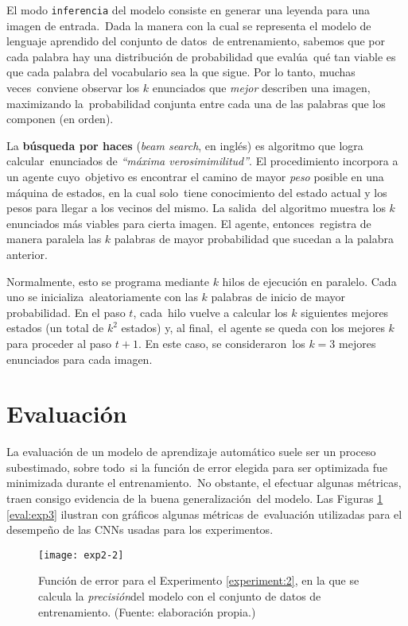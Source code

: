 \noindent
El modo \verb+inferencia+ del modelo consiste en generar una leyenda para una imagen de entrada.\
Dada la manera con la cual se representa el modelo de lenguaje aprendido del conjunto de datos\
de entrenamiento, sabemos que por cada palabra hay una distribución de probabilidad que evalúa\
qué tan viable es que cada palabra del vocabulario sea la que sigue. Por lo tanto, muchas veces\
conviene observar los $k$ enunciados que \emph{mejor} describen una imagen, maximizando la\
probabilidad conjunta entre cada una de las palabras que los componen (en orden).\par
La \textbf{búsqueda por haces} (\emph{beam search}, en inglés) es algoritmo que logra calcular\
enunciados de \emph{``máxima verosimimilitud''}. El procedimiento incorpora a un agente cuyo\
objetivo es encontrar el camino de mayor \emph{peso} posible en una máquina de estados, en la cual solo\
tiene conocimiento del estado actual y los pesos para llegar a los vecinos del mismo. La salida\
del algoritmo muestra los $k$ enunciados más viables para cierta imagen. El agente, entonces\
registra de manera paralela las $k$ palabras de mayor probabilidad que sucedan a la palabra anterior.\par
Normalmente, esto se programa mediante $k$ hilos de ejecución en paralelo. Cada uno se inicializa\
aleatoriamente con las $k$ palabras de inicio de mayor probabilidad. En el paso $t$, cada\
hilo vuelve a calcular los $k$ siguientes mejores estados (un total de $k^2$ estados) y, al final,\
el agente se queda con los mejores $k$ para proceder al paso $t+1$. En este caso, se consideraron\
los $k=3$ mejores enunciados para cada imagen.

\section{Evaluación} \label{sec:metrics}

\noindent
La evaluación de un modelo de aprendizaje automático suele ser un proceso subestimado, sobre todo\
si la función de error elegida para ser optimizada fue minimizada durante el entrenamiento.\
No obstante, el efectuar algunas métricas, traen consigo evidencia de la buena generalización\
del modelo. Las Figuras \ref{eval:exp2} \ref{eval:exp3} ilustran con gráficos algunas métricas de\
evaluación utilizadas para el desempeño de las CNNs usadas para los experimentos.

\begin{figure}[H]
  \texttt{[image: exp2-2]}
  \caption[Nota al pie]{
    Función de error para el Experimento \ref{experiment:2}, en la que se
    calcula la \emph{precisión}\footnotemark del modelo con el conjunto de
    datos de entrenamiento.
    (Fuente: elaboración propia.)
  }
  \label{eval:exp2}
\end{figure}

